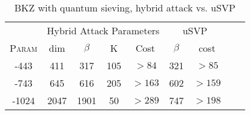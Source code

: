 \documentclass{llncs}
\newcommand{\ntru}{{\sf{NTRU}}}
\newcommand{\<}{\langle}
\renewcommand{\>}{\rangle}
\begin{document}
\begin{table}%
\centering\caption{BKZ with quantum sieving, hybrid attack vs. uSVP}
\begin{tabular}{|*{9}{c|}}\hline

                                    &   \multicolumn{4}{c|}{Hybrid Attack Parameters}                                        & \multicolumn{2}{c|}{uSVP}  \\\cline{2-7}

 \textsc{Param}            &   dim   & $\beta$    &  K      &   Cost               &    $\beta$ & cost  \\\hline\hline

\ntru-443     &  411   &   317          &    105    &           $>84$ & 321& $>85$\\

\ntru-743     &   645   &   616           &    205    &     $>163$       & 602 &$>159$   \\
\ntru-1024     &   2047   &   1901          &    50    &     $>289$     & 747 & $>198$  \\\hline
\end{tabular}
\end{table}






\end{document}

